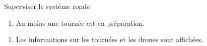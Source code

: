  \begin{UseCase}{Superviser le système ronde}


    \begin{UseCasePre}
        \begin{enumerate}
            \item Au moins une tournée est en préparation.
        \end{enumerate}
    \end{UseCasePre}

    \begin{UseCasePost}
        \begin{enumerate}
            \item Les informations sur les tournées et les drones
                sont affichées.
        \end{enumerate}
    \end{UseCasePost}


\end{UseCase}

